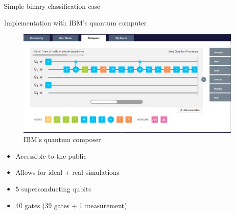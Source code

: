 \documentclass[10pt]{beamer}
\begin{document}
{\begin{frame}{Simple binary classification case}

\end{frame}
}

{
\begin{frame}{Implementation with IBM's quantum computer}

\begin{figure}
\includegraphics[height=0.5\textwidth]{IBMamplitudecomposer.png}
       \caption{\footnotesize{IBM's quantum composer} }
\end{figure}
\vspace{-5mm}
\begin{minipage}[t]{.5\textwidth}
\begin{itemize}
\item Accessible to the public
\item Allows for ideal + real simulations
\end{itemize}
\end{minipage}%
\begin{minipage}[t]{.5\textwidth}
\begin{itemize}
\item 5 superconducting qubits
\item 40 gates (39 gates + 1 measurement)

\end{itemize}
\end{minipage}
\end{frame}
}
\end{document}
